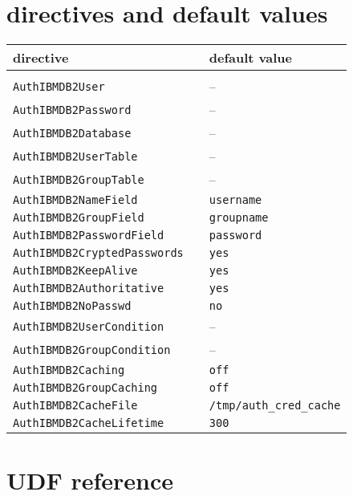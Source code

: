 \documentclass[11pt,a4paper]{article}
\begin{document}
\begin{appendix}
\section{directives and default values} \label{default}
\vspace{5ex}
\begin{tabular}{@{} lll @{}}
directive & & default value \\
\hline
& & \\
{\tt AuthIBMDB2User} & & -- \\[0.5ex]
{\tt AuthIBMDB2Password} & & -- \\[0.5ex]
{\tt AuthIBMDB2Database} & & -- \\[0.5ex]
{\tt AuthIBMDB2UserTable} & & -- \\[0.5ex]
{\tt AuthIBMDB2GroupTable} & & -- \\[0.5ex]
{\tt AuthIBMDB2NameField} & & {\tt username} \\[0.5ex]
{\tt AuthIBMDB2GroupField} & & {\tt groupname} \\[0.5ex]
{\tt AuthIBMDB2PasswordField} & & {\tt password} \\[0.5ex]
{\tt AuthIBMDB2CryptedPasswords} & & {\tt yes} \\[0.5ex]
{\tt AuthIBMDB2KeepAlive} & & {\tt yes} \\[0.5ex]
{\tt AuthIBMDB2Authoritative} & & {\tt yes} \\[0.5ex] 
{\tt AuthIBMDB2NoPasswd} & & {\tt no} \\[0.5ex]
{\tt AuthIBMDB2UserCondition} & & -- \\[0.5ex]
{\tt AuthIBMDB2GroupCondition} & & -- \\[0.5ex]
{\tt AuthIBMDB2Caching} & & {\tt off} \\[0.5ex]
{\tt AuthIBMDB2GroupCaching} & & {\tt off} \\[0.5ex]
{\tt AuthIBMDB2CacheFile} & & {\tt /tmp/auth\_cred\_cache} \\[0.5ex]
{\tt AuthIBMDB2CacheLifetime} & & {\tt 300} \\[0.5ex]
\end{tabular}
\newpage
\section{UDF reference} \label{udfreference}

\end{appendix}
\end{document}
